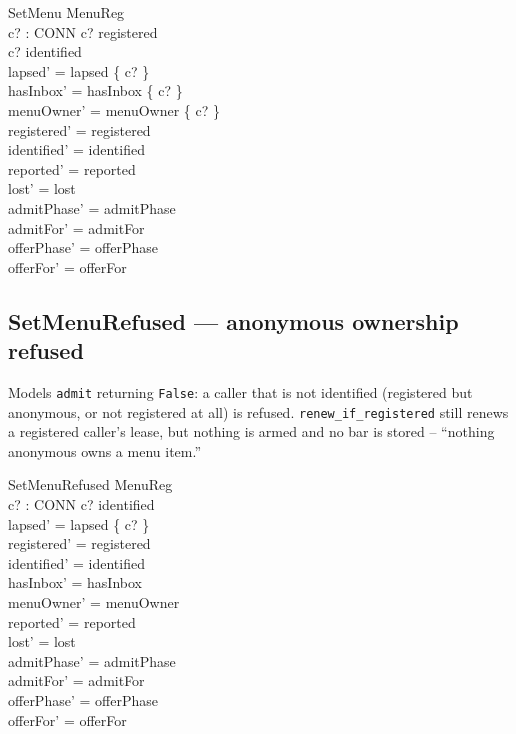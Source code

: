 \documentclass[a4paper,10pt,fleqn]{article}
\begin{document}
\begin{schema}{SetMenu}
  \Delta MenuReg \\
  c? : CONN
\where
  c? \in registered \\
  c? \in identified \\
  lapsed' = lapsed \setminus \{ c? \} \\
  hasInbox' = hasInbox \cup \{ c? \} \\
  menuOwner' = menuOwner \cup \{ c? \} \\
  registered' = registered \\
  identified' = identified \\
  reported' = reported \\
  lost' = lost \\
  admitPhase' = admitPhase \\
  admitFor' = admitFor \\
  offerPhase' = offerPhase \\
  offerFor' = offerFor
\end{schema}

\subsection{SetMenuRefused --- anonymous ownership refused}

Models \texttt{admit} returning \texttt{False}: a caller that is not
identified (registered but anonymous, or not registered at all) is refused.
\texttt{renew\_if\_registered} still renews a registered caller's lease, but
nothing is armed and no bar is stored -- ``nothing anonymous owns a menu
item.''

\begin{schema}{SetMenuRefused}
  \Delta MenuReg \\
  c? : CONN
\where
  c? \notin identified \\
  lapsed' = lapsed \setminus \{ c? \} \\
  registered' = registered \\
  identified' = identified \\
  hasInbox' = hasInbox \\
  menuOwner' = menuOwner \\
  reported' = reported \\
  lost' = lost \\
  admitPhase' = admitPhase \\
  admitFor' = admitFor \\
  offerPhase' = offerPhase \\
  offerFor' = offerFor
\end{schema}
\end{document}
